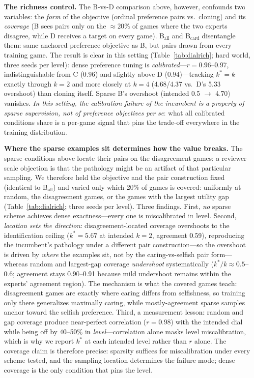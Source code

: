 \documentclass[11pt]{article}
\begin{document}
\textbf{The richness control.} The B-vs-D comparison above, however, confounds two variables:
the \emph{form} of the objective (ordinal preference pairs vs.\ cloning) and its \emph{coverage}
(B sees pairs only on the $\approx$20\% of games where the two experts disagree, while D receives
a target on every game). B$_{\mathrm{all}}$ and B$_{\mathrm{card}}$ disentangle them: same
anchored preference objective as B, but pairs drawn from every training game. The result is
clear in this setting (Table~\ref{tab:dialrich}; hard world, three seeds per level): dense preference
tuning is \emph{calibrated}---$r{=}0.96$--0.97, indistinguishable from C ($0.96$) and slightly
above D ($0.94$)---tracking $k^*{=}k$ exactly through $k{=}2$ and more closely at $k{=}4$
(4.68/4.37 vs.\ D's 5.33 overshoot) than cloning itself. Sparse B's overshoot (intended 0.5
$\to$ 4.70) vanishes. \emph{In this setting, the calibration failure of the incumbent is a property of sparse
supervision, not of preference objectives per se}: what all calibrated conditions share is a
per-game signal that pins the trade-off everywhere in the training distribution.

\textbf{Where the sparse examples sit determines how the value breaks.} The sparse conditions above locate their pairs on the disagreement games; a reviewer-scale objection is that the pathology might be an artifact of that particular sampling. We therefore held the objective and the pair construction fixed (identical to B$_{\mathrm{all}}$) and varied only which 20\% of games is covered: uniformly at random, the disagreement games, or the games with the largest utility gap (Table~\ref{tab:dialrich}; three seeds per level). Three findings. First, \emph{no} sparse scheme achieves dense exactness---every one is miscalibrated in level. Second, \emph{location sets the direction}: disagreement-located coverage overshoots to the identification ceiling ($k^*{=}5.67$ at intended $k{=}2$, agreement 0.59), reproducing the incumbent's pathology under a different pair construction---so the overshoot is driven by \emph{where} the examples sit, not by the caring-vs-selfish pair form---whereas random and largest-gap coverage \emph{undershoot} systematically ($k^{*}/k \approx 0.5$--$0.6$; agreement stays 0.90--0.91 because mild undershoot remains within the experts' agreement region). The mechanism is what the covered games teach: disagreement games are exactly where caring differs from selfishness, so training only there generalizes maximally caring, while mostly-agreement sparse samples anchor toward the selfish preference. Third, a measurement lesson: random and gap coverage produce near-perfect correlation ($r{=}0.98$) with the intended dial while being off by 40--50\% in \emph{level}---correlation alone masks level miscalibration, which is why we report $k^*$ at each intended level rather than $r$ alone. The coverage claim is therefore precise: sparsity suffices for miscalibration under every scheme tested, and the sampling location determines the failure mode; dense coverage is the only condition that pins the level.
\end{document}
